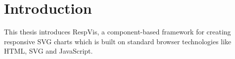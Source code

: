 \chapter{Introduction}

This thesis introduces RespVis, a component-based framework for creating responsive SVG charts which is built on standard browser technologies like HTML, SVG and JavaScript.

